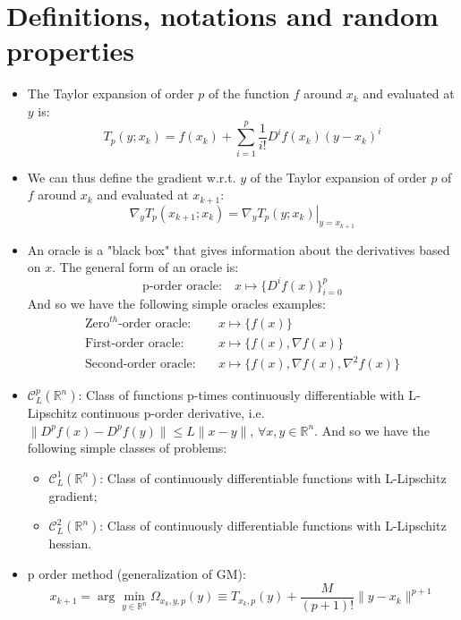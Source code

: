 \documentclass[12pt, openany]{report}
\newcommand{\R}{\mathbb{R}}
\newcommand{\C}{\mathcal{C}}
\theoremstyle{definition}
\begin{document}
\chapter{Definitions, notations and random properties}
\begin{itemize}
	\item The Taylor expansion of order $p$ of the function $f$ around $x_k$ and evaluated at $y$ is: 
	\begin{equation}
		T_p(y;x_k) = f(x_k) + \sum_{i=1}^{p} \frac{1}{i!} D^i f(x_k) (y-x_k)^i
	\end{equation}
	\item We can thus define the gradient w.r.t. $y$ of the Taylor expansion of order $p$ of $f$ around $x_k$ and evaluated at $x_{k+1}$:
	\begin{equation}
		\nabla_y T_p(x_{k+1};x_k) = \left. \nabla_y T_p(y;x_k) \right|_{y=x_{k+1}}
	\end{equation}
	\item An oracle is a "black box" that gives information about the derivatives based on $x$. The general form of an oracle is:
	\begin{equation}
		\text{p-order oracle:} \quad x \mapsto \{D^if(x)\}_{i=0}^p
	\end{equation}
	And so we have the following simple oracles examples:
	\begin{equation}
		\begin{aligned}
			\text{Zero}^{th} \text{-order oracle:} \quad &x \mapsto \{f(x)\} \\
			\text{First-order oracle:} \quad &x \mapsto \{ f(x), \nabla f(x) \} \\
			\text{Second-order oracle:} \quad &x \mapsto \{ f(x), \nabla f(x), \nabla^2 f(x) \}
		\end{aligned}
	\end{equation}
    \item $\C^p_L(\R^n)$: Class of functions p-times continuously differentiable with L-Lipschitz continuous p-order derivative, i.e. $\| D^pf(x) - D^pf(y) \| \leq L \|x-y \|$, $\forall x,y\in \R^n$. And so we have the following simple classes of problems:
    \begin{itemize}
		\item $\C^1_L(\R^n)$: Class of continuously differentiable functions with L-Lipschitz gradient;
    \item $\C^2_L(\R^n)$: Class of continuously differentiable functions with L-Lipschitz hessian.
	\end{itemize}
	\item  p order method (generalization of GM):
	\begin{equation}
		x_{k+1} = \arg\min_{y\in \R^n} \Omega_{x_k,y,p}(y) \equiv T_{x_k,p}(y) + \frac{M}{(p+1)!}\|y-x_k\|^{p+1}
	\end{equation}
\end{itemize}
\end{document}
